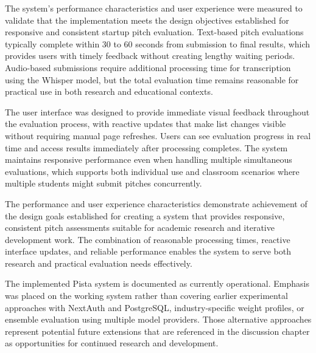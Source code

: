 The system's performance characteristics and user experience were measured to validate that the implementation meets the design objectives established for responsive and consistent startup pitch evaluation. Text-based pitch evaluations typically complete within 30 to 60 seconds from submission to final results, which provides users with timely feedback without creating lengthy waiting periods. Audio-based submissions require additional processing time for transcription using the Whisper model, but the total evaluation time remains reasonable for practical use in both research and educational contexts.

The user interface was designed to provide immediate visual feedback throughout the evaluation process, with reactive updates that make list changes visible without requiring manual page refreshes. Users can see evaluation progress in real time and access results immediately after processing completes. The system maintains responsive performance even when handling multiple simultaneous evaluations, which supports both individual use and classroom scenarios where multiple students might submit pitches concurrently.

The performance and user experience characteristics demonstrate achievement of the design goals established for creating a system that provides responsive, consistent pitch assessments suitable for academic research and iterative development work. The combination of reasonable processing times, reactive interface updates, and reliable performance enables the system to serve both research and practical evaluation needs effectively.

The implemented Pista system is documented as currently operational. Emphasis was placed on the working system rather than covering earlier experimental approaches with NextAuth and PostgreSQL, industry-specific weight profiles, or ensemble evaluation using multiple model providers. Those alternative approaches represent potential future extensions that are referenced in the discussion chapter as opportunities for continued research and development.
